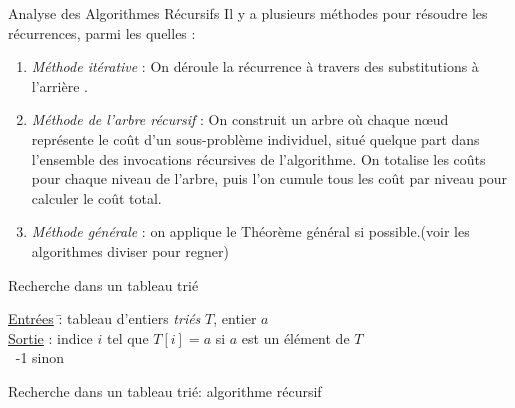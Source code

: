 \begin{frame}{Analyse des Algorithmes Récursifs}
Il y a plusieurs méthodes pour résoudre les récurrences, parmi les quelles :
 \begin{enumerate}
 \item  \emph{Méthode itérative} : On déroule la récurrence à travers des substitutions à l’arrière .
   \item \emph{Méthode de l’arbre récursif} : On construit un arbre où chaque nœud représente le coût d'un sous-problème individuel, situé quelque part dans l'ensemble des invocations récursives de l'algorithme. On totalise les coûts pour chaque niveau de l'arbre, puis l'on cumule tous les coût par niveau pour calculer le coût total.
  \item \emph{Méthode générale} : on applique le Théorème général si possible.(voir les algorithmes diviser pour regner)
  \end{enumerate}
\end{frame}

\begin{frame}{Recherche dans un tableau trié}
  \begin{tabbing}
    \underline{Entrées}  \= : tableau d'entiers \emph{triés} $T$, entier $a$ \\
    \underline{Sortie} \> :  indice $i$ tel que $T[i] = a$ si $a$ est
    un élément de $T$ \\
    \> $~$ -1 sinon
  \end{tabbing}
  

\end{frame}


\begin{frame}{Recherche dans un tableau trié: algorithme récursif}
~\\~\\
\end{frame}

